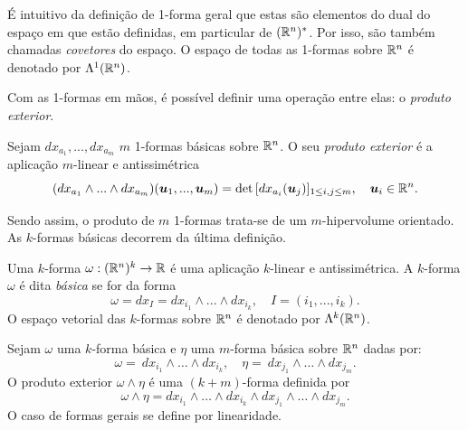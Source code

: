 É intuitivo da definição de 1-forma geral que estas são elementos do dual do espaço em que estão definidas, em particular de $(\mathbb{R}^n)^*$. Por isso, são também chamadas \textit{covetores} do espaço. O espaço de todas as 1-formas sobre $\mathbb{R}^n$ é denotado por $\Lambda^1 (\mathbb{R}^n)$.

Com as 1-formas em mãos, é possível definir uma operação entre elas: o \textit{produto exterior}.

\begin{definition}
   Sejam $dx_{a_1}, ..., dx_{a_m}$ $m$ 1-formas básicas sobre $\mathbb{R}^n$. O seu \textit{produto exterior} é a aplicação $m$-linear e antissimétrica
   \begin{equation*}
       (dx_{a_1} \wedge ... \wedge dx_{a_m})(\bm u_1, ..., \bm u_m) = \det{[dx_{a_i}(\bm u_j)]_{1 \leq i, j \leq m}}, \quad \bm u_i \in \mathbb{R}^n.
   \end{equation*}
\end{definition}

Sendo assim, o produto de $m$ 1-formas trata-se de um $m$-hipervolume orientado. As $k$-formas básicas decorrem da última definição.

\begin{definition}[$k$-formas]
    Uma $k$-forma $\omega:(\mathbb{R}^n)^k \to \mathbb{R}$ é uma aplicação $k$-linear e antissimétrica. A $k$-forma $\omega$ é dita \textit{básica} se for da forma
    \begin{equation*}
        \omega = dx_{I} = dx_{i_1} \wedge ... \wedge dx_{i_k}, \quad I = (i_1, ..., i_k).
    \end{equation*}
    O espaço vetorial das $k$-formas sobre $\mathbb{R}^n$ é denotado por $\Lambda^k(\mathbb{R}^n)$.
\end{definition}

\begin{definition}
    Sejam $\omega$ uma $k$-forma básica e $\eta$ uma $m$-forma básica sobre $\mathbb{R}^n$ dadas por:
    \begin{equation*}
        \omega = \ dx_{i_1} \wedge \hdots \wedge dx_{i_k}, 
        \quad
        \eta = \ dx_{j_1} \wedge \hdots \wedge dx_{j_m}.
    \end{equation*}
    O produto exterior $\omega \wedge \eta$ é uma $(k+m)$-forma definida por
    \begin{equation*}
        \omega \wedge \eta = dx_{i_1} \wedge \hdots \wedge dx_{i_k} \wedge dx_{j_1} \wedge \hdots \wedge dx_{j_m}.
    \end{equation*}
    O caso de formas gerais se define por linearidade.
\end{definition}

